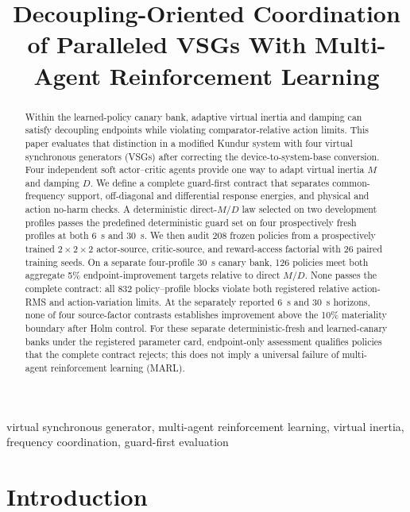 \documentclass[conference,a4paper]{IEEEtran}
\title{Decoupling-Oriented Coordination of Paralleled  VSGs With
Multi-Agent Reinforcement Learning}
\author{
\IEEEauthorblockN{Yuang Wei, Yixiao Wang, and Zhuang Xu}
\IEEEauthorblockA{
Department of Electrical and Electronic Engineering\\
University of Nottingham Ningbo China, Ningbo, China\\
John.XU@nottingham.edu.cn}
}
\begin{document}
\pagestyle{empty}
\maketitle
\renewcommand{\IEEEkeywordsname}{Keywords}

\begin{abstract}
Within the learned-policy canary bank, adaptive virtual inertia and damping can
satisfy decoupling endpoints while violating comparator-relative action limits.
This paper evaluates that distinction in a modified Kundur system with four
virtual synchronous generators (VSGs) after correcting the
device-to-system-base conversion. Four independent soft actor--critic agents
provide one way to adapt virtual inertia $M$ and damping $D$. We define a
complete guard-first contract that
separates common-frequency support, off-diagonal and differential response
energies, and physical and action no-harm checks. A deterministic direct-$M/D$
law selected on two development profiles passes the predefined deterministic
guard set on four prospectively fresh profiles at both \SI{6}{s} and
\SI{30}{s}. We then audit 208
frozen policies from a prospectively trained $2\times2\times2$ actor-source,
critic-source, and reward-access factorial with 26 paired training seeds. On a
separate four-profile \SI{30}{s} canary bank, 126 policies meet both aggregate
5\% endpoint-improvement targets relative to direct $M/D$. None passes the
complete contract: all 832 policy--profile blocks violate both registered
relative action-RMS and action-variation limits. At the separately reported
\SI{6}{s} and \SI{30}{s} horizons, none of four source-factor contrasts
establishes improvement above the 10\% materiality boundary after Holm control.
For these separate deterministic-fresh and learned-canary banks under the
registered parameter card, endpoint-only assessment qualifies policies that the
complete contract rejects; this does not imply a universal failure of
multi-agent reinforcement learning (MARL).
\end{abstract}

\begin{IEEEkeywords}
virtual synchronous generator, multi-agent reinforcement learning, virtual
inertia, frequency coordination, guard-first evaluation
\end{IEEEkeywords}

\section{Introduction}
\end{document}
